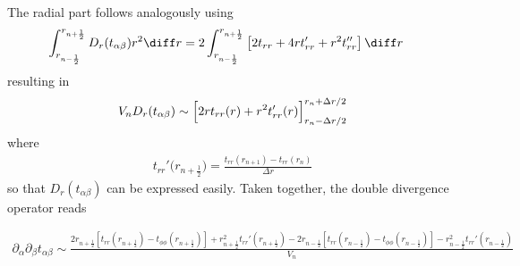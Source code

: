 \documentclass[
	superscriptaddress,
	twocolumn,
	aps, pre
]{revtex4-1}
\newcommand{\dr}{\Delta r}
\begin{document}
The radial part follows analogously using
\begin{align}
	\int_{r_{n - \frac12}}^{r_{n + \frac12}} D_r(t_{\alpha\beta}) r^2  \diff r
	&= 2\int_{r_{n - \frac12}}^{r_{n + \frac12}} \left[
			 2 t_{rr} + 4 rt_{rr}' + r^2t_{rr}''
		\right]\diff r	
\end{align}
resulting in
\begin{align}
	V_n D_r(t_{\alpha\beta}) \sim
	\Bigl[2 r t_{rr}(r) + r^2 t_{rr}'(r)\Bigr]_{r_n - \dr/2}^{r_n + \dr/2}
\end{align}
where
\begin{align}
	t_{rr}'\bigl(r_{n + \frac12}\bigr) = \frac{t_{rr}(r_{n+1}) - t_{rr}(r_n)}{\dr}
\end{align}
so that $D_r(t_{\alpha\beta})$ can be expressed easily.
Taken together, the double divergence operator reads
\begin{widetext}
\begin{align}
	\partial_\alpha\partial_\beta t_{\alpha\beta} \sim \frac{
	2 r_{n+\frac12} \left[t_{rr}(r_{n+\frac12}) - t_{\phi\phi}(r_{n+\frac12}) \right]
	+ r_{n+\frac12}^2 t_{rr}'(r_{n+\frac12})
	-2 r_{n-\frac12} \left[t_{rr}(r_{n-\frac12})  -  t_{\phi\phi}(r_{n-\frac12})\right]
	- r_{n-\frac12}^2 t_{rr}'(r_{n-\frac12})
	}{V_n}
\end{align}
\end{widetext}


%
%
\end{document}
